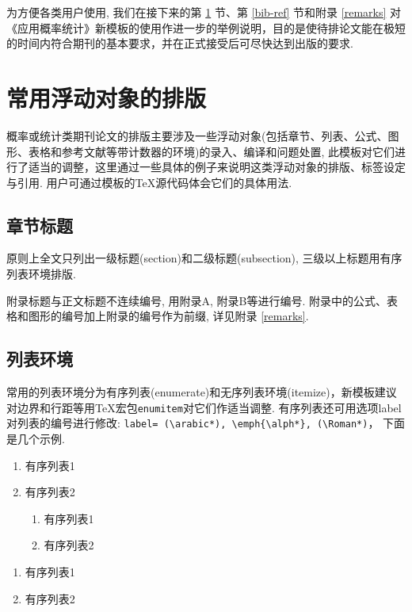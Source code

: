 \documentclass[Chinese]{APSart}
\begin{document}
为方便各类用户使用, 我们在接下来的第 \ref{floats} 节、第 \ref{bib-ref} 节和附录 \ref{remarks} 对《应用概率统计》新模板的使用作进一步的举例说明，目的是使待排论文能在极短的时间内符合期刊的基本要求，并在正式接受后可尽快达到出版的要求.  


\section{常用浮动对象的排版} \label{floats}
概率或统计类期刊论文的排版主要涉及一些浮动对象(包括章节、列表、公式、图形、表格和参考文献等带计数器的环境)的录入、编译和问题处置, 此模板对它们进行了适当的调整，这里通过一些具体的例子来说明这类浮动对象的排版、标签设定与引用. 用户可通过模板的\TeX{}源代码体会它们的具体用法. 

\subsection{章节标题}
原则上全文只列出一级标题(section)和二级标题(subsection), 三级以上标题用有序列表环境排版. 

\begin{remark}
	附录标题与正文标题不连续编号, 用附录A, 附录B等进行编号. 附录中的公式、表格和图形的编号加上附录的编号作为前缀, 详见附录 \ref{remarks}.
\end{remark}


\subsection{列表环境}
常用的列表环境分为有序列表(enumerate)和无序列表环境(itemize)，新模板建议对边界和行距等用\TeX{}宏包\texttt{enumitem}对它们作适当调整. 有序列表还可用选项label对列表的编号进行修改: 
\verb/label= (\arabic*), \emph{\alph*}, (\Roman*)/， 下面是几个示例. 

\begin{enumerate}[leftmargin=7.8mm,itemsep=-0.1ex,label=\arabic*)]
	\item 有序列表1
	\item 有序列表2
	\begin{enumerate}[leftmargin=7.8mm,itemsep=-0.1ex,label=(\alph*)]
		\item 有序列表1
		\item 有序列表2
	\end{enumerate}
\end{enumerate}

\begin{enumerate}[leftmargin=7.8mm,itemsep=-0.1ex,label=(\Roman*)]
	\item 有序列表1
	\item 有序列表2
\end{enumerate}
\end{document}
